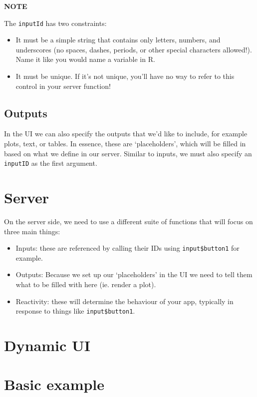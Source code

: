 \documentclass[
]{book}
\providecommand{\tightlist}{%
  \setlength{\itemsep}{0pt}\setlength{\parskip}{0pt}}
\begin{document}
\textbf{NOTE}

The \texttt{inputId} has two constraints:

\begin{itemize}
\item
  It must be a simple string that contains only letters, numbers, and underscores (no spaces, dashes, periods, or other special characters allowed!). Name it like you would name a variable in R.
\item
  It must be unique. If it's not unique, you'll have no way to refer to this control in your server function!
\end{itemize}

\hypertarget{outputs}{%
\subsection{Outputs}\label{outputs}}

In the UI we can also specify the outputs that we'd like to include, for example plots, text, or tables. In essence, these are `placeholders', which will be filled in based on what we define in our server. Similar to inputs, we must also specify an \texttt{inputID} as the first argument.

\hypertarget{server}{%
\section{Server}\label{server}}

On the server side, we need to use a different suite of functions that will focus on three main things:

\begin{itemize}
\tightlist
\item
  Inputs: these are referenced by calling their IDs using \texttt{input\$button1} for example.
\item
  Outputs: Because we set up our `placeholders' in the UI we need to tell them what to be filled with here (ie. render a plot).
\item
  Reactivity: these will determine the behaviour of your app, typically in response to things like \texttt{input\$button1}.
\end{itemize}

\hypertarget{dynamic-ui}{%
\section{Dynamic UI}\label{dynamic-ui}}

\hypertarget{basic-example}{%
\section{Basic example}\label{basic-example}}
\end{document}

